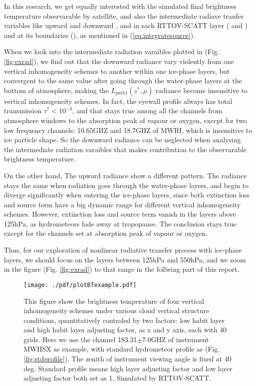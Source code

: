 In this research, we get equally interested with the simulated final brightness temperature observarable by satellite,
and also the intermediate radiave tranfer variables like upward and downward ,  and
 in each RTTOV-SCATT layer ( and ) and at its boundaries (), 
as mentioned in (\ref{eq:integratesource}).

When we look into the intermediate radiation varaibles plotted in (Fig. \ref{fig:exrad}), we find out that the 
downward radiance vary violently from one vertical inhomogeneity schemes to another within one ice-phase layers, but convergent to 
the same value after going through the water-phase layers at the bottom of atmosphere, making the $L_{path1}(z^{*}, \mu)$ radiance 
become insensitive to vertical inhomogeneity schemes. In fact, the eyewall profile always has total transmission $\tau^{*} < 10^{-3}$, 
and that stays true among all the channels from atmosphere windows to the absorption peak of vapour or oxygen, except for 
two low frequency channels: 10.65GHZ and 18.7GHZ of MWRI, which is insensitive to ice particle shape. 
So the downward radiance can be neglected when analysing the intermediate radiation varaibles that makes contribution 
to the observarable brightness temperature.

On the other hand, The upward radiance show a different pattern. The radiance stays the same when radiation goes through the water-phase
layers, and begin to diverge significantly when entering the ice-phase layers, since both extinction loss and source term have a big
dynamic range for different vertical inhomogeneity schemes. However, extinction loss and source term vanish in the layers above 125hPa, 
as hydrometeors fade away at tropopause. The conclusion stays true except for the channels set at absorption peak of vapour or oxygen.

Thus, for our exploration of nonlinear radiative transfer process with ice-phase layers, we should focus on the layers between
125hPa and 550hPa, and we zoom in the figure (Fig. \ref{fig:exrad}) to that range in the follwing part of this report.

\begin{figure}[hbtp] 
\centering
\texttt{[image: ./pdf/plotBTexample.pdf]}
\caption{This figure show the brightness temperature of four vertical inhomogeneity schemes under various cloud vertical 
structure conditions, quantitatively controled by two factors: low habit layer and high habit layer adjusting factor, 
as x and y axis, each with 40 grids. Here we use the channel 183.31$\pm$7.0GHZ of instrument MWHSX as example, with standard hydrometeor 
profile as (Fig. \ref{fig:stdprofile}). The zenith of instrument viewing angle is fixed at 40 deg.
Standard profile means high layer adjusting factor and low layer adjusting factor both set as 1.
Simulated by RTTOV-SCATT.}
\label{fig:exBT}
\end{figure}


